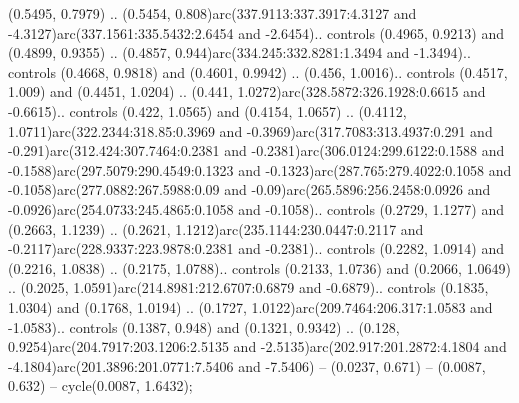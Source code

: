 (0.5495, 0.7979) .. (0.5454, 0.808)arc(337.9113:337.3917:4.3127 and -4.3127)arc(337.1561:335.5432:2.6454 and -2.6454).. controls (0.4965, 0.9213) and (0.4899, 0.9355) .. (0.4857, 0.944)arc(334.245:332.8281:1.3494 and -1.3494).. controls (0.4668, 0.9818) and (0.4601, 0.9942) .. (0.456, 1.0016).. controls (0.4517, 1.009) and (0.4451, 1.0204) .. (0.441, 1.0272)arc(328.5872:326.1928:0.6615 and -0.6615).. controls (0.422, 1.0565) and (0.4154, 1.0657) .. (0.4112, 1.0711)arc(322.2344:318.85:0.3969 and -0.3969)arc(317.7083:313.4937:0.291 and -0.291)arc(312.424:307.7464:0.2381 and -0.2381)arc(306.0124:299.6122:0.1588 and -0.1588)arc(297.5079:290.4549:0.1323 and -0.1323)arc(287.765:279.4022:0.1058 and -0.1058)arc(277.0882:267.5988:0.09 and -0.09)arc(265.5896:256.2458:0.0926 and -0.0926)arc(254.0733:245.4865:0.1058 and -0.1058).. controls (0.2729, 1.1277) and (0.2663, 1.1239) .. (0.2621, 1.1212)arc(235.1144:230.0447:0.2117 and -0.2117)arc(228.9337:223.9878:0.2381 and -0.2381).. controls (0.2282, 1.0914) and (0.2216, 1.0838) .. (0.2175, 1.0788).. controls (0.2133, 1.0736) and (0.2066, 1.0649) .. (0.2025, 1.0591)arc(214.8981:212.6707:0.6879 and -0.6879).. controls (0.1835, 1.0304) and (0.1768, 1.0194) .. (0.1727, 1.0122)arc(209.7464:206.317:1.0583 and -1.0583).. controls (0.1387, 0.948) and (0.1321, 0.9342) .. (0.128, 0.9254)arc(204.7917:203.1206:2.5135 and -2.5135)arc(202.917:201.2872:4.1804 and -4.1804)arc(201.3896:201.0771:7.5406 and -7.5406) -- (0.0237, 0.671) -- (0.0087, 0.632) -- cycle(0.0087, 1.6432);




